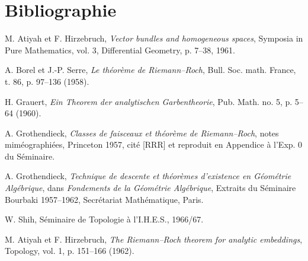 \documentclass[11pt]{article}
\begin{document}
\section*{Bibliographie}
\begin{enumerate}[label={[\arabic*]},leftmargin=2.5em]
\item M. Atiyah et F. Hirzebruch, \emph{Vector bundles and homogeneous spaces}, Symposia in Pure Mathematics, vol. 3, Differential Geometry, p. 7--38, 1961.
\item A. Borel et J.-P. Serre, \emph{Le th\'eor\`eme de Riemann--Roch}, Bull. Soc. math. France, t. 86, p. 97--136 (1958).
\item H. Grauert, \emph{Ein Theorem der analytischen Garbentheorie}, Pub. Math. no. 5, p. 5--64 (1960).
\item A. Grothendieck, \emph{Classes de faisceaux et th\'eor\`eme de Riemann--Roch}, notes mim\'eographi\'ees, Princeton 1957, cit\'e [RRR] et reproduit en Appendice \`a l'Exp. 0 du S\'eminaire.
\item A. Grothendieck, \emph{Technique de descente et th\'eor\`emes d'existence en G\'eom\'etrie Alg\'ebrique}, dans \emph{Fondements de la G\'eom\'etrie Alg\'ebrique}, Extraits du S\'eminaire Bourbaki 1957--1962, Secr\'etariat Math\'ematique, Paris.
\item W. Shih, S\'eminaire de Topologie \`a l'I.H.E.S., 1966/67.
\item M. Atiyah et F. Hirzebruch, \emph{The Riemann--Roch theorem for analytic embeddings}, Topology, vol. 1, p. 151--166 (1962).
\end{enumerate}
\end{document}
